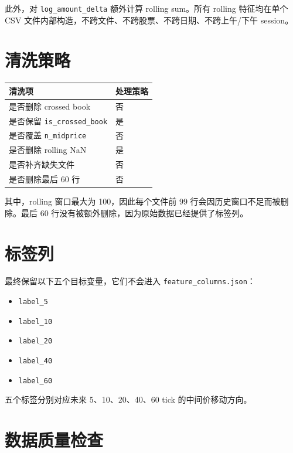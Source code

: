 \documentclass[UTF8,a4paper,12pt]{ctexart}
\begin{document}
此外，对 \texttt{log\_amount\_delta} 额外计算 rolling sum。所有 rolling 特征均在单个 CSV 文件内部构造，不跨文件、不跨股票、不跨日期、不跨上午/下午 session。

\section{清洗策略}

\begin{longtable}{p{8cm}p{5cm}}
\toprule
\textbf{清洗项} & \textbf{处理策略} \\
\midrule
是否删除 crossed book & 否 \\
是否保留 \texttt{is\_crossed\_book} & 是 \\
是否覆盖 \texttt{n\_midprice} & 否 \\
是否删除 rolling NaN & 是 \\
是否补齐缺失文件 & 否 \\
是否删除最后 60 行 & 否 \\
\bottomrule
\end{longtable}

其中，rolling 窗口最大为 100，因此每个文件前 99 行会因历史窗口不足而被删除。最后 60 行没有被额外删除，因为原始数据已经提供了标签列。

\section{标签列}

最终保留以下五个目标变量，它们不会进入 \texttt{feature\_columns.json}：

\begin{itemize}
  \item \texttt{label\_5}
  \item \texttt{label\_10}
  \item \texttt{label\_20}
  \item \texttt{label\_40}
  \item \texttt{label\_60}
\end{itemize}

五个标签分别对应未来 5、10、20、40、60 tick 的中间价移动方向。

\section{数据质量检查}
\end{document}
